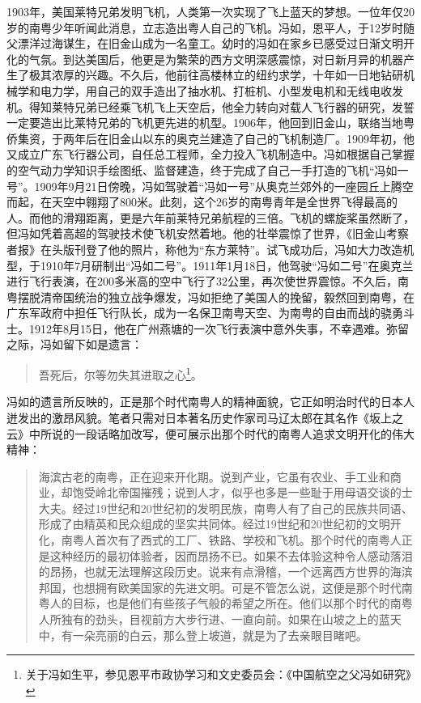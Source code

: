 1903年，美国莱特兄弟发明飞机，人类第一次实现了飞上蓝天的梦想。一位年仅20岁的南粤少年听闻此消息，立志造出粤人自己的飞机。冯如，恩平人，于12岁时随父漂洋过海谋生，在旧金山成为一名童工。幼时的冯如在家乡已感受过日渐文明开化的气氛。到达美国后，他更是为繁荣的西方文明深感震惊，对日新月异的机器产生了极其浓厚的兴趣。不久后，他前往高楼林立的纽约求学，十年如一日地钻研机械学和电力学，用自己的双手造出了抽水机、打桩机、小型发电机和无线电收发机。得知莱特兄弟已经乘飞机飞上天空后，他全力转向对载人飞行器的研究，发誓一定要造出比莱特兄弟的飞机更先进的机型。1906年，他回到旧金山，联络当地粤侨集资，于两年后在旧金山以东的奥克兰建造了自己的飞机制造厂。1909年初，他又成立广东飞行器公司，自任总工程师，全力投入飞机制造中。冯如根据自己掌握的空气动力学知识手绘图纸、监督建造，终于完成了自己一手打造的飞机“冯如一号”。1909年9月21日傍晚，冯如驾驶着“冯如一号”从奥克兰郊外的一座园丘上腾空而起，在天空中翱翔了800米。此刻，这个26岁的南粤青年是全世界飞得最高的人。而他的滑翔距离，更是六年前莱特兄弟航程的三倍。飞机的螺旋桨虽然断了，但冯如凭着高超的驾驶技术使飞机安然着地。他的壮举震惊了世界，《旧金山考察者报》在头版刊登了他的照片，称他为“东方莱特”。试飞成功后，冯如大力改造机型，于1910年7月研制出“冯如二号”。1911年1月18日，他驾驶“冯如二号”在奥克兰进行飞行表演，在200多米高的空中飞行了32公里，再次使世界震惊。不久后，南粤摆脱清帝国统治的独立战争爆发，冯如拒绝了美国人的挽留，毅然回到南粤，在广东军政府中担任飞行队长，成为一名保卫南粤天空、为南粤的自由而战的骁勇斗士。1912年8月15日，他在广州燕塘的一次飞行表演中意外失事，不幸遇难。弥留之际，冯如留下如是遗言：

\begin{quote}

吾死后，尔等勿失其进取之心\footnote{关于冯如生平，参见恩平市政协学习和文史委员会：《中国航空之父冯如研究》}。

\end{quote}

冯如的遗言所反映的，正是那个时代南粤人的精神面貌，它正如明治时代的日本人迸发出的激昂风貌。笔者只需对日本著名历史作家司马辽太郎在其名作《坂上之云》中所说的一段话略加改写，便可展示出那个时代的南粤人追求文明开化的伟大精神：

\begin{quote}
海滨古老的南粤，正在迎来开化期。说到产业，它虽有农业、手工业和商业，却饱受岭北帝国摧残；说到人才，似乎也多是一些耻于用母语交谈的士大夫。经过19世纪和20世纪初的发明民族，南粤人有了自己的民族共同语、形成了由精英和民众组成的坚实共同体。经过19世纪和20世纪初的文明开化，南粤人首次有了西式的工厂、铁路、学校和飞机。那个时代的南粤人正是这种经历的最初体验者，因而昂扬不已。如果不去体验这种令人感动落泪的昂扬，也就无法理解这段历史。说来有点滑稽，一个远离西方世界的海滨邦国，也想拥有欧美国家的先进文明。可是不管怎么说，这便是那个时代南粤人的目标，也是他们有些孩子气般的希望之所在。他们以那个时代的南粤人所独有的劲头，目视前方大步行进、一直向前。如果在山坡之上的蓝天中，有一朵亮丽的白云，那么登上坡道，就是为了去亲眼目睹吧。
\end{quote}







